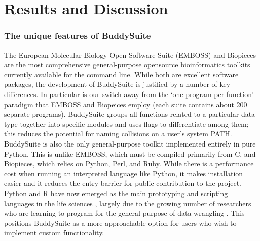 \documentclass[nogrid]{MBE_article}%
\begin{document}
\section{Results and Discussion}
\subsubsection{The unique features of BuddySuite}
The European Molecular Biology Open Software Suite (EMBOSS) and Biopieces are the most comprehensive general-purpose opensource bioinformatics toolkits currently available for the command line. While both are excellent software packages, the development of BuddySuite is justified by a number of key differences. In particular is our switch away from the `one program per function' paradigm that EMBOSS and Biopeices employ (each suite contains about 200 separate programs). BuddySuite groups all functions related to a particular data type together into specific modules and uses flags to differentiate among them; this reduces the potential for naming collisions on a user\rq{}s system PATH. BuddySuite is also the only general-purpose toolkit implemented entirely in pure Python. This is unlike EMBOSS, which must be compiled primarily from C, and Biopieces, which relies on Python, Perl, and Ruby. While there is a performance cost when running an interpreted language like Python,  it makes installation easier and it reduces the entry barrier for public contribution to the project. Python and R have now emerged as the main prototyping and scripting languages in the life sciences \cite{Ekmekci:2016co}, largely due to the growing number of researchers who are learning to program for the general purpose of data wrangling \cite{Hannay:2009hv}. This positions BuddySuite as a more approachable option for users who wish to implement custom functionality.
\end{document}
